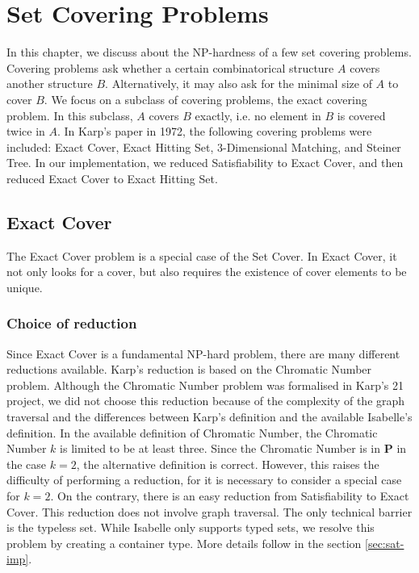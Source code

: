 \chapter{Set Covering Problems}\label{chapter:covering}
In this chapter, we discuss about the NP-hardness of a few set covering problems. 
Covering problems ask whether a certain combinatorical structure $A$ covers another structure $B$. 
Alternatively, it may also ask for the minimal size of $A$ to cover $B$. 
We focus on a subclass of covering problems, the exact covering problem. In this subclass, 
$A$ covers $B$ exactly, i.e. no element in $B$ is covered twice in $A$. 
In Karp's paper in 1972, the following covering problems were included: Exact Cover, Exact Hitting Set,
3-Dimensional Matching, and Steiner Tree. In our implementation, we reduced Satisfiability to Exact Cover, and then reduced Exact Cover to Exact Hitting Set. 

\section{Exact Cover}
The Exact Cover problem is a special case of the Set Cover. In Exact Cover, it not only looks for a cover, but also requires the existence of 
cover elements to be unique. 

\subsection{Choice of reduction}
Since Exact Cover is a fundamental NP-hard problem, there are many different reductions available. 
Karp's reduction is based on the  Chromatic Number problem. 
Although the Chromatic Number problem was formalised in Karp's 21 project, we did not choose this reduction
because of the complexity of the graph traversal and the differences between Karp's definition and the available Isabelle's definition. 
In the available definition of Chromatic Number, the Chromatic Number $k$ is limited to be at least three. Since 
the Chromatic Number is in \textbf{P} in the case $k = 2$, the alternative definition is correct. However, this raises the difficulty of performing 
a reduction, for it is necessary to consider a special case for $k = 2$. 
On the contrary, there is an easy reduction from Satisfiability to Exact Cover. This reduction does not involve graph traversal.
The only technical barrier is the typeless set. While Isabelle only supports typed sets, we resolve this problem
by creating a container type. More details follow in the section \ref*{sec:sat-imp}. 

